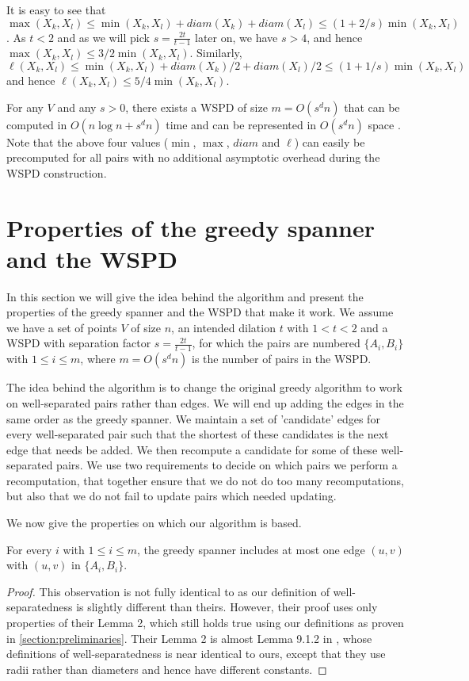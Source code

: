 \documentclass[runningheads,envcountsame,oribibl,orivec]{llncs}
\begin{document}
It is easy to see that $\max(X_k, X_l) \leq \min(X_k, X_l) + diam(X_k) + diam(X_l) \leq (1 + 2/s) \min(X_k, X_l)$. As $t < 2$ and as we will pick $s = \frac{2t}{t-1}$ later on, we have $s > 4$, and hence $\max(X_k, X_l) \leq 3/2 \min(X_k, X_l)$. Similarly, $\ell(X_k, X_l) \leq \min(X_k, X_l) + diam(X_k)/2 + diam(X_l)/2 \leq (1 + 1/s) \min(X_k, X_l)$ and hence $\ell(X_k, X_l) \leq 5/4 \min(X_k, X_l)$.

For any $V$ and any $s>0$, there exists a WSPD of size $m=O(s^d n)$ that can be computed in $O(n \log n + s^d n)$ time and can be represented in $O(s^d n)$ space \cite{Callahan95dealingwith}. Note that the above four values ($\min$, $\max$, $diam$ and $\ell$) can easily be precomputed for all pairs with no additional asymptotic overhead during the WSPD construction.

\section{Properties of the greedy spanner and the WSPD} \label{section:properties}

In this section we will give the idea behind the algorithm and present the properties of the greedy spanner and the WSPD that make it work. We assume we have a set of points $V$ of size $n$, an intended dilation $t$ with $1 < t < 2$ and a WSPD with separation factor $s = \frac{2t}{t-1}$, for which the pairs are numbered $\{A_i, B_i\}$ with $1 \leq i \leq m$, where $m = O(s^d n)$ is the number of pairs in the WSPD.


The idea behind the algorithm is to change the original greedy algorithm to work on well-separated pairs rather than edges. We will end up adding the edges in the same order as the greedy spanner. We maintain a set of 'candidate' edges for every well-separated pair such that the shortest of these candidates is the next edge that needs be added. We then recompute a candidate for some of these well-separated pairs. We use two requirements to decide on which pairs we perform a recomputation, that together ensure that we do not do too many recomputations, but also that we do not fail to update pairs which needed updating.

We now give the properties on which our algorithm is based.

\begin{observation} \label{observation:wspdgreedy}
 For every $i$ with $1 \leq i \leq m$, the greedy spanner includes at most one edge $(u, v)$ with $(u, v)$ in $\{ A_i, B_i \}$.
\end{observation}
\begin{proof}
This observation is not fully identical to \cite{BoseCFMS2010} as our definition of well-separatedness is slightly different than theirs. However, their proof uses only properties of their Lemma 2, which still holds true using our definitions as proven in \ref{section:preliminaries}. Their Lemma 2 is almost Lemma 9.1.2 in \cite{Narasimhan:2007:GSN:1208237}, whose definitions of well-separatedness is near identical to ours, except that they use radii rather than diameters and hence have different constants.
\end{proof}
\end{document}
